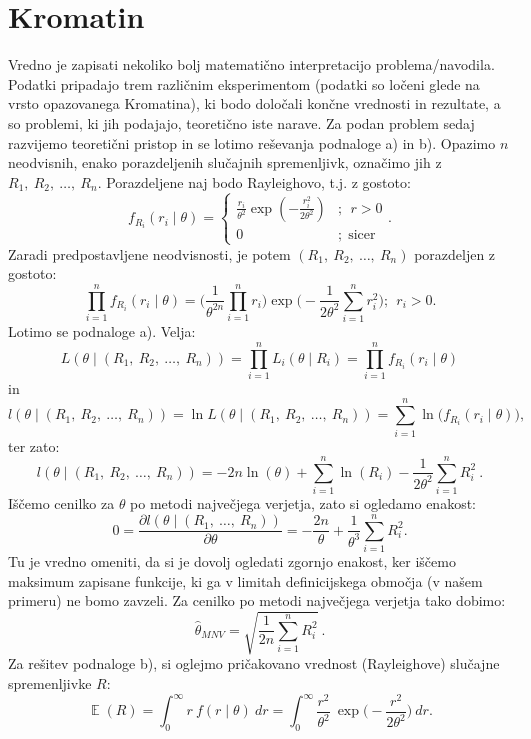 \documentclass{article}
\DeclareMathOperator{\EX}{\mathbb{E}}
\begin{document}
\pagebreak

\section{Kromatin}
Vredno je zapisati nekoliko bolj matematično interpretacijo problema/navodila. 
Podatki pripadajo trem različnim eksperimentom (podatki so ločeni glede na vrsto opazovanega Kromatina), ki bodo določali končne vrednosti in rezultate, a so problemi, ki jih podajajo, teoretično iste narave. 
Za podan problem sedaj razvijemo teoretični pristop in se lotimo reševanja podnaloge a) in b). 
\newline
\newline
Opazimo $n$ neodvisnih, enako porazdeljenih slučajnih spremenljivk, označimo jih z $R_1,~R_2,~\dots,~R_n$. 
Porazdeljene naj bodo Rayleighovo, t.j. z gostoto:
$$
f_{R_i}(r_{i} \mid \theta)=\left\{\begin{array}{cl}
\frac{r_i}{\theta^{2}} \exp \left(-\frac{r_{i}^{2}}{2 \theta^{2}}\right) & ;~~r>0 \\
0 & ;~~\text{sicer }
\end{array}\right. .
$$
Zaradi predpostavljene neodvisnosti, je potem $(R_1,~R_2,~\dots,~R_n)$ porazdeljen z gostoto:
$$
    \prod_{i=1}^{n}{f_{R_i}(r_{i} \mid \theta)} = 
    \bigg(\frac{1}{\theta^{2n}}\prod_{i=1}^{n}{r_i}\bigg) \exp\bigg(-\frac{1}{2 \theta^{2}} \sum_{i=1}^{n}{r_i^2}\bigg);~~r_i>0.
$$
Lotimo se podnaloge a). Velja:
$$
L(\theta \mid (R_1,~R_2,~\dots,~R_n)) = \prod_{i=1}^{n}{L_i(\theta \mid R_i)} = \prod_{i=1}^{n}{f_{R_i}(r_i \mid \theta)}
$$
in
$$
l(\theta \mid (R_1,~R_2,~\dots,~R_n)) = \ln L(\theta \mid (R_1,~R_2,~\dots,~R_n)) = \sum_{i=1}^{n}{\ln \big(f_{R_i}(r_i \mid \theta)\big)}, 
$$
ter zato:
$$
l(\theta \mid (R_1,~R_2,~\dots,~R_n)) = -2n \ln(\theta) + \sum_{i=1}^{n}{\ln(R_i)} - \frac{1}{2\theta^2} \sum_{i=1}^{n}{R_i^2}~.
$$
Iščemo cenilko za $\theta$ po metodi največjega verjetja, zato si ogledamo enakost:
$$
0 = \frac{\partial l(\theta \mid (R_1,~\dots,~R_n))}{\partial \theta} = - \frac{2n}{\theta} + \frac{1}{\theta^3}\sum_{i=1}^{n}{R_i^2}.
$$
Tu je vredno omeniti, da si je dovolj ogledati zgornjo enakost, ker iščemo maksimum zapisane funkcije, ki ga v limitah definicijskega območja (v našem primeru) ne bomo zavzeli.
Za cenilko po metodi največjega verjetja tako dobimo:
$$
\hat{\theta}_{MNV} = \sqrt{\frac{1}{2n}{\sum_{i=1}^{n}{R_i^2}}}~.
$$
Za rešitev podnaloge b), si oglejmo pričakovano vrednost (Rayleighove) slučajne spremenljivke $R$:
$$
\EX(R) = \int_{0}^{\infty}{r~f(r \mid \theta)~dr}= \int_{0}^{\infty}{\frac{r^2}{\theta^{2}}~\exp\Big(-\frac{r^{2}}{2 \theta^{2}}\Big)~dr}.
$$
\end{document}
